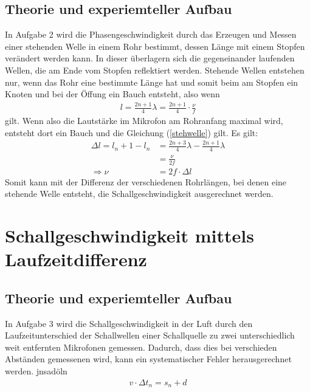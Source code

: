 \documentclass[11pt, a4paper]{article}
\begin{document}
    \subsection{Theorie und experiemteller Aufbau}
    In Aufgabe 2 wird die Phasengeschwindigkeit durch das Erzeugen und Messen 
    einer stehenden Welle in einem Rohr bestimmt, dessen Länge mit einem Stopfen verändert werden kann.
    In dieser überlagern sich die gegeneinander laufenden Wellen,
    die  am Ende vom Stopfen reflektiert werden. Stehende Wellen entstehen nur, wenn das Rohr eine bestimmte Länge hat
    und somit beim am Stopfen ein Knoten und bei der Öffung ein Bauch entsteht, also wenn
    \begin{align} \label{stehwelle}
        l = \frac{2n+1}{4} \lambda = \frac{2n + 1}{4} \cdot \frac{\nu}{f}
    \end{align}
    gilt. Wenn also die Lautstärke im Mikrofon am Rohranfang maximal wird, entsteht dort ein Bauch und die Gleichung
    (\ref{stehwelle}) gilt. Es gilt: 
    \begin{align}
        \Delta l = l_n+1 - l_n &= \frac{2n+3}{4} \lambda - \frac{2n+1}{4} \lambda \nonumber \\
        &= \frac{\nu}{2f} \nonumber \\
         \Rightarrow \nu &= 2f \cdot \Delta l
    \end{align}
    Somit kann mit der Differenz der verschiedenen Rohrlängen, bei denen eine stehende Welle 
    entsteht, die Schallgeschwindigkeit ausgerechnet werden.

    \section{Schallgeschwindigkeit mittels Laufzeitdifferenz}

    \subsection{Theorie und experiemteller Aufbau}
    In Aufgabe 3 wird die Schallgeschwindigkeit in der Luft durch den Laufzeitunterschied der Schallwellen einer Schallquelle zu zwei unterschiedlich
    weit entfernten Mikrofonen gemessen. Dadurch, dass dies bei verschieden Abständen gemessenen wird, kann ein systematischer
    Fehler herausgerechnet werden. jnsadöln
    \begin{align}
        v \cdot \Delta t_n = s_n + d
    \end{align}
    
\end{document}
